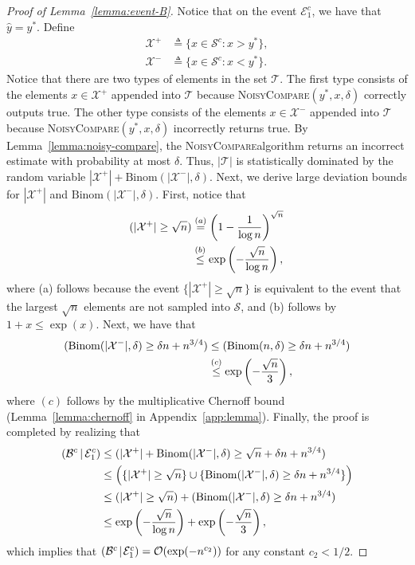 \documentclass[journal, onecolumn]{IEEEtran}
\theoremstyle{plain}
\theoremstyle{definition}
\theoremstyle{remark}
\def\cs{{\mathcal S}}
\def\ct{{\mathcal T}}
\def\ce{{\mathcal E}}
\def\cb{{\mathcal B}}
\def\cx{{\mathcal X}}
\def\co{{\mathcal O}}
\let\P\relax
\DeclareMathOperator\P{\mathsf{P}}
\newcommand{\cond}{\mathchoice{\,\vert\,}{\mspace{2mu}\vert\mspace{2mu}}{\vert}{\vert}}
\newcommand{\snc}{\textsc{NoisyCompare}}
\begin{document}
\begin{proof}[Proof of Lemma~\ref{lemma:event-B}]
    Notice that on the event $\ce_1^c$, we have that $\hat{y}=y^*$. Define 
    \begin{align*}
        \cx^+ &\triangleq \{x\in \cs^c: x>y^*\},\\
        \cx^- &\triangleq \{x\in \cs^c: x<y^*\}.
    \end{align*}
    Notice that there are two types of elements in the set $\ct$. The first type consists of the elements $x\in \cx^+$ appended into $\ct$ because \snc$(y^*,x,\delta)$ correctly outputs true. The other type consists of the elements $x\in \cx^-$ appended into $\ct$ because \snc$(y^*,x,\delta)$ incorrectly returns true. By Lemma~\ref{lemma:noisy-compare}, the \snc algorithm returns an incorrect estimate with probability at most $\delta$. Thus, $|\ct|$ is statistically dominated by the random variable $|\cx^+|+\mathrm{Binom}(|\cx^-|,\delta)$. Next, we derive large deviation bounds for $|\cx^+|$ and $\mathrm{Binom}(|\cx^-|,\delta)$. First, notice that
    \begin{align*}
        \P(|\cx^+|\ge \sqrt{n})&\stackrel{(a)}{=}\left(1-\frac{1}{\log n}\right)^{\sqrt{n}}\\
        &\stackrel{(b)}{\le} \exp\left(-\frac{\sqrt{n}}{\log n}\right),
    \end{align*}
    where (a) follows because the event $\{|\cx^+|\ge \sqrt{n}\}$ is equivalent to the event that the largest $\sqrt{n}$ elements are not sampled into $\cs$, and (b) follows by $1+x\le \exp(x)$. Next, we have that
    \begin{align*}
        \P(\mathrm{Binom}(|\cx^-|,\delta)\ge \delta n+n^{3/4})&\le \P(\mathrm{Binom}(n,\delta)\ge \delta n+n^{3/4})\\
        &\stackrel{(c)}{\le}\exp\left(-\frac{\sqrt{n}}{3}\right),
    \end{align*}
    where $(c)$ follows by the multiplicative Chernoff bound (Lemma~\ref{lemma:chernoff} in Appendix~\ref{app:lemma}). Finally, the proof is completed by realizing that
    \begin{align*}
        \P(\cb^c \cond \ce_1^c)&\le \P(|\cx^+|+\mathrm{Binom}(|\cx^-|,\delta)\ge \sqrt{n}+\delta n+n^{3/4})\\
        &\le \P\left( \{|\cx^+|\ge \sqrt{n}\} \cup \{\mathrm{Binom}(|\cx^-|,\delta)\ge \delta n+n^{3/4}\}\right)\\
        &\le \P(|\cx^+|\ge \sqrt{n})+\P(\mathrm{Binom}(|\cx^-|,\delta)\ge \delta n+n^{3/4})\\
        &\le \exp\left(-\frac{\sqrt{n}}{\log n}\right)+\exp\left(-\frac{\sqrt{n}}{3}\right),
    \end{align*}
    which implies that $\P(\cb^c \cond \ce_1^c) = \co(\exp(-n^{c_2}))$ for any constant $c_2 < 1/2$.
\end{proof}
\end{document}
